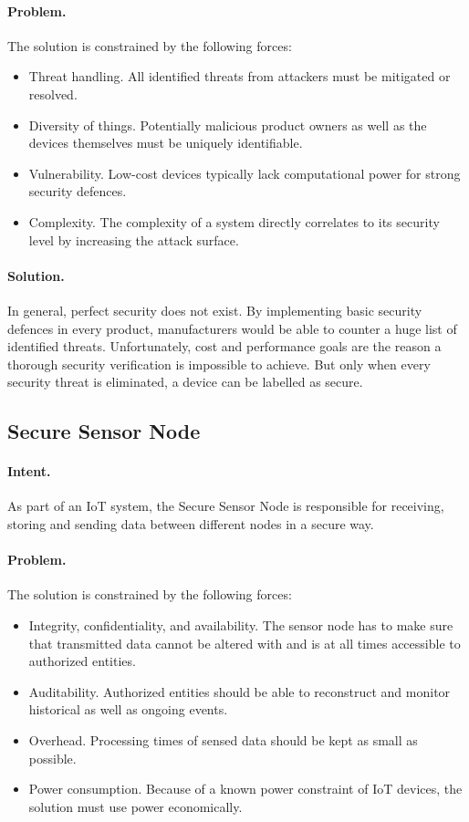 \paragraph{\textbf{Problem.}} The solution is constrained by the following forces:
\begin{itemize}
	\item Threat handling. All identified threats from attackers must be mitigated or resolved.
	\item Diversity of things. Potentially malicious product owners as well as the devices themselves must be uniquely identifiable.
	\item Vulnerability. Low-cost devices typically lack computational power for strong security defences. 
	\item Complexity. The complexity of a system directly correlates to its security level by increasing the attack surface. 
\end{itemize}

\paragraph{\textbf{Solution.}} In general, perfect security does not exist. By implementing basic security defences in every product, manufacturers would be able to counter a huge list of identified threats. Unfortunately, cost and performance goals are the reason a thorough security verification is impossible to achieve. But only when every security threat is eliminated, a device can be labelled as secure.


\subsection{Secure Sensor Node~\cite{Orellana2020}} 
\label{p:node}

\paragraph{\textbf{Intent.}} As part of an IoT system, the Secure Sensor Node is responsible for receiving, storing and sending data between different nodes in a secure way. 

\paragraph{\textbf{Problem.}} The solution is constrained by the following forces:
\begin{itemize}
	\item Integrity, confidentiality, and availability. The sensor node has to make sure that transmitted data cannot be altered with and is at all times accessible to authorized entities.
	\item Auditability. Authorized entities should be able to reconstruct and monitor historical as well as ongoing events. 
	\item Overhead. Processing times of sensed data should be kept as small as possible.
	\item Power consumption. Because of a known power constraint of IoT devices, the solution must use power economically. 
\end{itemize}

